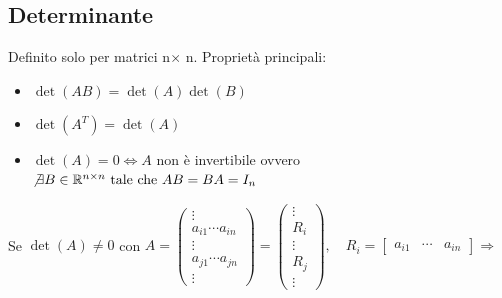 \documentclass[12pt,a4paper]{article}
\begin{document}
\subsection*{Determinante}
Definito solo per matrici n$\times$ n. Proprietà principali:
\begin{itemize}
  \item \( \det(AB) = \det(A)\det(B) \)
  \item \( \det(A^T) = \det(A) \)
  \item \( \det(A) = 0 \iff A \) non è invertibile ovvero $\not\exists B \in \mathbb{R}^{n\times n} \text{ tale che }  AB=BA=I_n$
\end{itemize}
Se $\det(
A) \ne 0$ con $A=\begin{pmatrix}
\vdots \\
a_{i1} \cdots a_{in} \\
\vdots \\
a_{j1} \cdots a_{jn} \\
\vdots
\end{pmatrix} = 
\begin{pmatrix}
\vdots \\
R_i \\
\vdots \\
R_j \\
\vdots
\end{pmatrix}, \quad R_i = \begin{bmatrix}
a_{i1} & \cdots & a_{in}
\end{bmatrix}\Rightarrow$
\end{document}
